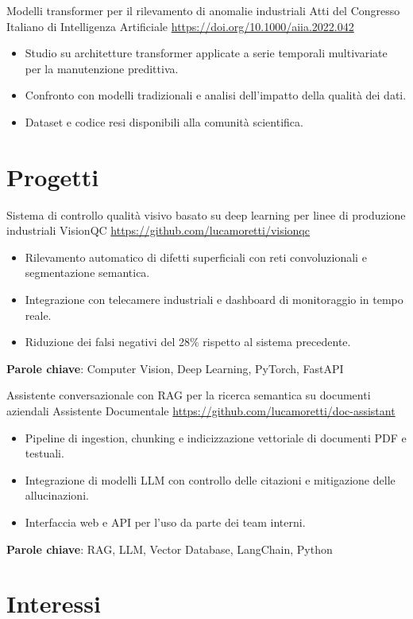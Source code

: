 \documentclass[a4paper, serif, 10pt]{moderncv}
\begin{document}
        {Modelli transformer per il rilevamento di anomalie industriali}
        {Atti del Congresso Italiano di Intelligenza Artificiale}
        {\url{https://doi.org/10.1000/aiia.2022.042}}
        {}
        {\begin{itemize}
\item Studio su architetture transformer applicate a serie temporali multivariate per la manutenzione predittiva.
\item Confronto con modelli tradizionali e analisi dell'impatto della qualità dei dati.
\item Dataset e codice resi disponibili alla comunità scientifica.
\end{itemize}}
\section{Progetti}

        {Sistema di controllo qualità visivo basato su deep learning per linee di produzione industriali}
        {VisionQC}
        {\url{https://github.com/lucamoretti/visionqc}}
        {}
        {\begin{itemize}
\item Rilevamento automatico di difetti superficiali con reti convoluzionali e segmentazione semantica.
\item Integrazione con telecamere industriali e dashboard di monitoraggio in tempo reale.
\item Riduzione dei falsi negativi del 28\% rispetto al sistema precedente.
\end{itemize}
\textbf{Parole chiave}: Computer Vision, Deep Learning, PyTorch, FastAPI}

        {Assistente conversazionale con RAG per la ricerca semantica su documenti aziendali}
        {Assistente Documentale}
        {\url{https://github.com/lucamoretti/doc-assistant}}
        {}
        {\begin{itemize}
\item Pipeline di ingestion, chunking e indicizzazione vettoriale di documenti PDF e testuali.
\item Integrazione di modelli LLM con controllo delle citazioni e mitigazione delle allucinazioni.
\item Interfaccia web e API per l'uso da parte dei team interni.
\end{itemize}
\textbf{Parole chiave}: RAG, LLM, Vector Database, LangChain, Python}
\section{Interessi}
\end{document}
